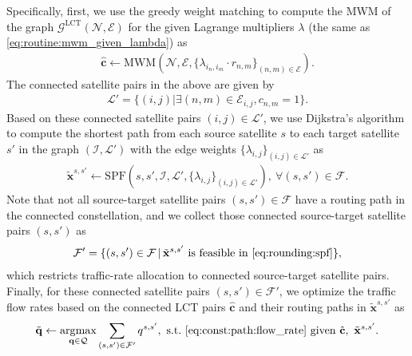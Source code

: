 \documentclass[journal]{IEEEtran}
\DeclareMathOperator*{\argmax}{\arg\!\max}
\begin{document}
Specifically, first, we use the greedy weight matching to compute the MWM of the graph $\mathcal{G}^{\text{LCT}}(\mathcal{N},\mathcal{E})$ for the given Lagrange multipliers $\lambda$ (the same as \eqref{eq:routine:mwm_given_lambda}) as
\begin{equation}\label{eq:rounding:mwm}
  \begin{aligned}
    \hat{\mathbf{c}} \leftarrow \mathrm{MWM}(\mathcal{N}, \mathcal{E}, \{\lambda_{i_n,i_m} \cdot r_{n,m}\}_{(n,m)\in \mathcal{E}}).
  \end{aligned}
\end{equation}
The connected satellite pairs in the above are given by
\begin{equation}
  \begin{aligned}
    \mathcal{L}' =\{(i,j)| \exists (n,m) \in \mathcal{E}_{i,j}, c_{n,m} = 1 \}.
  \end{aligned}
\end{equation}
Based on these connected satellite pairs $(i,j)\in\mathcal{L}'$, we use Dijkstra's algorithm to compute the shortest path from each source satellite $s$ to each target satellite $s'$ in the graph $(\mathcal{I}, \mathcal{L}')$ with the edge weights $\{\lambda_{i,j}\}_{(i,j)\in \mathcal{L}'}$ as
\begin{equation}\label{eq:rounding:spf}
  \begin{aligned}
    \tilde{\mathbf{x}}^{s,s'} \leftarrow \mathrm{SPF}(s,s',\mathcal{I}, \mathcal{L}', \{\lambda_{i,j}\}_{(i,j)\in \mathcal{L}'}), \ \forall (s,s')\in\mathcal{F}.
  \end{aligned}
\end{equation}
Note that not all source-target satellite pairs $(s,s')\in\mathcal{F}$ have a routing path in the connected constellation, and we collect those connected source-target satellite pairs $(s,s')$ as
\begin{equation}
  \begin{aligned}
    \mathcal{F}' = \{(s,s')\in\mathcal{F} \,|\, \tilde{\mathbf{x}}^{s,s'}\ \text{is feasible in}\ \text{\eqref{eq:rounding:spf}}\},
  \end{aligned}
\end{equation}
which restricts traffic-rate allocation to connected source-target satellite pairs.
Finally, for these connected satellite pairs $(s,s')\in\mathcal{F}'$, we optimize the traffic flow rates based on the connected LCT pairs $\hat{\mathbf{c}}$ and their routing paths in $\tilde{\mathbf{x}}^{s,s'}$ as
\begin{equation}\label{eq:rounding:frm}
  \begin{aligned}
    \tilde{\mathbf{q}} \leftarrow \argmax_{
        \substack{
          \mathbf{q}\in \mathcal{Q}
        }
      }
      \sum_{(s,s')\in\mathcal{F}'}  q^{s,s'}, \ \text{s.t.}\ \eqref{eq:const:path:flow_rate}\ \text{given}\ \hat{\mathbf{c}},\ \tilde{\mathbf{x}}^{s,s'}.
  \end{aligned}
\end{equation}
\end{document}

